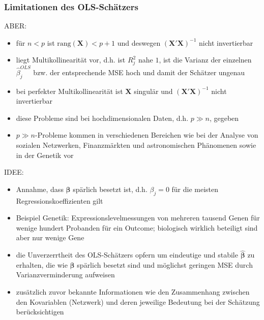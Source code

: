 \documentclass{beamer}
\begin{document}
\begin{frame} %
  \frametitle{Limitationen des OLS-Schätzers} 
  ABER: 
    \begin{itemize}
    \pause \item für $n < p$ ist $\text{rang}(\mathbf{X}
    )<p+1$ und deswegen $\left(\mathbf{X}'\mathbf{X}\right)^{-1}$ nicht invertierbar
    \pause \item liegt Multikollinearität vor, d.h. ist $R^2_j$ nahe $1$, ist die Varianz der einzelnen $\hat{\beta}_j^{OLS}$ bzw. der entsprechende MSE hoch und damit der Schätzer ungenau
    \pause \item bei perfekter Multikollinearität ist $\mathbf{X}$ singulär und $\left(\mathbf{X}'\mathbf{X}\right)^{-1}$ nicht invertierbar
    \end{itemize}
    \begin{itemize}
    \pause \item diese Probleme sind bei hochdimensionalen Daten, d.h. $p \gg n$, gegeben
    \item $p \gg n$-Probleme kommen in verschiedenen Bereichen wie bei der Analyse von sozialen Netzwerken, Finanzmärkten und astronomischen Phänomenen sowie in der Genetik vor
    \end{itemize}
    
\end{frame}

\begin{frame}
	IDEE:
	\begin{itemize}
	\pause \item Annahme, dass $\boldsymbol{\beta}$ spärlich besetzt ist, d.h. $\beta_j=0$ für die meisten Regressionskoeffizienten gilt
	\pause \item Beispiel Genetik: Expressionslevelmessungen von mehreren tausend Genen für wenige hundert Probanden für ein Outcome; biologisch wirklich beteiligt sind aber nur wenige Gene
	\pause \item die Unverzerrtheit des OLS-Schätzers {\glqq}opfern{\grqq} um eindeutige und stabile $\boldsymbol{\hat{\beta}}$ zu erhalten, die wie $\boldsymbol{\beta}$ spärlich besetzt sind und möglichst geringen MSE durch Varianzverminderung aufweisen
	\pause \item zusätzlich zuvor bekannte Informationen wie den Zusammenhang zwischen den Kovariablen (Netzwerk) und deren jeweilige Bedeutung bei der Schätzung berücksichtigen
	\end{itemize}
\end{frame}
\end{document}

